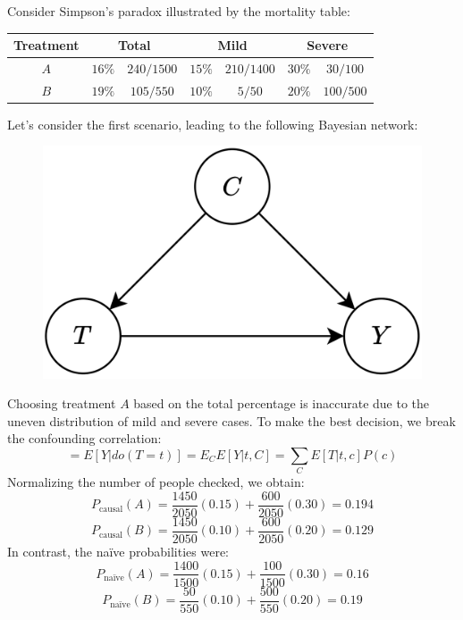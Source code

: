\begin{example}
    Consider Simpson's paradox illustrated by the mortality table:
    \begin{table}[H]
        \centering
        \begin{tabular}{|c|cc|cccc|}
        \hline
        \textbf{Treatment} & \multicolumn{2}{c|}{\textbf{Total}} & \multicolumn{2}{c}{\textbf{Mild}} & \multicolumn{2}{c|}{\textbf{Severe}} \\ \hline
        $A$                & $16\%$         & $240/1500$         & $15\%$        & $210/1400$        & $30\%$          & $30/100$           \\
        $B$                & $19\%$         & $105/550$          & $10\%$        & $5/50$            & $20\%$          & $100/500$          \\ \hline
        \end{tabular}
    \end{table}
    Let's consider the first scenario, leading to the following Bayesian network:
    \begin{figure}[H]
        \centering
        \includegraphics[width=0.25\linewidth]{images/cau.png}
    \end{figure}
    Choosing treatment $A$ based on the total percentage is inaccurate due to the uneven distribution of mild and severe cases. 
    To make the best decision, we break the confounding correlation:
    \[=E\left[Y|do(T=t)\right]=E_CE\left[Y|t,C\right]=\sum_C E\left[ T|t,c \right]P(c)\]
    Normalizing the number of people checked, we obtain:
    \[P_{\text{causal}}(A)=\dfrac{1450}{2050}(0.15)+\dfrac{600}{2050}(0.30)=0.194\]
    \[P_{\text{causal}}(B)=\dfrac{1450}{2050}(0.10)+\dfrac{600}{2050}(0.20)=0.129\]
    In contrast, the naïve probabilities were:
    \[P_{\text{naïve}}(A)=\dfrac{1400}{1500}(0.15)+\dfrac{100}{1500}(0.30)=0.16\]
    \[P_{\text{naïve}}(B)=\dfrac{50}{550}(0.10)+\dfrac{500}{550}(0.20)=0.19\]
\end{example}